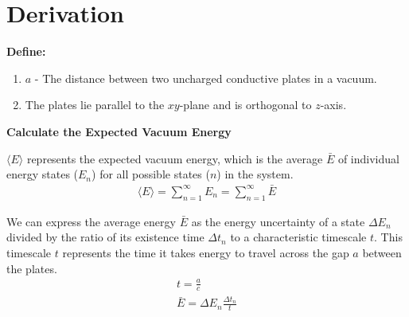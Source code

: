 \section{Derivation}
\noindent\textbf{Define:}
\begin{enumerate}
    \item $a$ - The distance between two uncharged conductive plates in a vacuum.
    \item The plates lie parallel to the \(xy\)-plane and is orthogonal to \(z\)-axis.
\end{enumerate}

\noindent\textbf{Calculate the Expected Vacuum Energy}

$\langle E \rangle$ represents the expected vacuum energy, 
which is the average $\bar E$ of individual energy states ($E_n$) for all possible states ($n$) in the system.
\begin{align}
    &\langle E \rangle = \sum_{n=1}^{\infty}E_n = \sum_{n=1}^{\infty}\bar{E}&
\end{align}

We can express the average energy $\bar E$ as the energy uncertainty of 
a state $\Delta E_n$ divided by the ratio of its existence time $\Delta t_n$ 
to a characteristic timescale $t$.
This timescale $t$ represents the time it takes energy to travel across the gap $a$ between the plates.
\begin{align}
    &t = \frac{a}{c}& \\
    &\bar{E} = \Delta E_n\frac{\Delta t_n}{t}&
\end{align}

